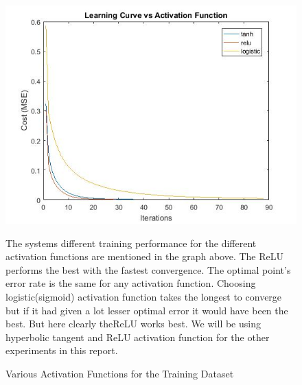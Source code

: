 \documentclass[conference]{IEEEtran}
\begin{document}
\begin{figure}

\includegraphics[scale=0.5]{activationVsLearningCurve.jpg}
\caption{Various Activation Functions for the Training Dataset}
\footnotesize{The systems different training performance for the different activation functions are mentioned in the graph above. The ReLU performs the best with the fastest convergence. The optimal point's error rate is the same for any activation function. Choosing logistic(sigmoid) activation function takes the longest to converge but if it had given a lot lesser optimal error it would have been the best. But here clearly theReLU works best. We will be using hyperbolic tangent and ReLU activation function for the other experiments in this report. }
\label{Activation Function}
\end{figure}
\end{document}
